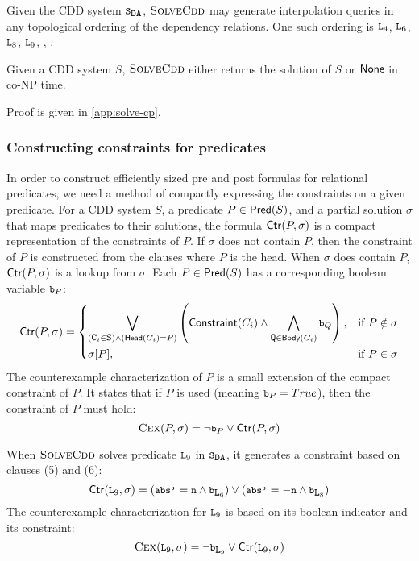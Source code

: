 %
\begin{ex}
  Given the CDD system $\mcchc$, $\textsc{SolveCdd}$ may generate interpolation
  queries in any topological ordering of the dependency relations.
  One such ordering is $\cc{L}_4$, $\cc{L}_6$, $\cc{L}_8$, $\cc{L}_9$, ,
  .
\end{ex}

\begin{thm}
  \label{thm:solve-cp}
  Given a CDD system $S$, $\textsc{SolveCdd}$ either returns the solution of $S$ or $\mathsf{None}$
  in co-NP time.
\end{thm}
Proof is given in \autoref{app:solve-cp}.

%
\subsubsection{Constructing constraints for predicates}
%
In order to construct efficiently sized pre and post formulas for
relational predicates, we need a method of compactly expressing the
constraints on a given predicate.
%
For a CDD system $S$, a predicate $P \in \mathsf{Pred}( S )$, and a partial
solution $\sigma$ that maps predicates to their solutions, the formula
$\mathsf{Ctr}(P,\sigma)$ is a compact representation of the constraints of
$P$.
%
If $\sigma$ does not contain $P$, then the constraint of $P$ is
constructed from the clauses where $P$ is the head.  When $\sigma$
does contain $P$, $\mathsf{Ctr}(P,\sigma)$ is a lookup from $\sigma$.
%
Each $P \in \mathsf{Pred}( S )$ has a corresponding boolean variable
$\cc{b}_P$:
%
\[
  \ctrof{P,\sigma}=
  \begin{dcases}
    \biglor_{(\cc{C}_i \in \cc{S}) \land (\headof{C_i} = P)}
    \left( \consof{C_i} \land %
      \bigland_{ \cc{Q} \in \bodyof{C_i}} \cc{b}_Q
    \right),
  &\text{if } P \notin \sigma\\
  \sigma[P], &\text{if } P \in \sigma
  \end{dcases}
\]
%
The counterexample characterization of $P$ is a small extension of the
compact constraint of $P$.
%
It states that if $P$ is used
(meaning $\cc{b}_{P} = True$), then the constraint of $P$ must hold:
\[
  \vc{P,\sigma} = \neg \cc{b}_{P} \lor \ctrof{P,\sigma}
\]


\begin{ex}
  \label{ex:ctr}
  When $\textsc{SolveCdd}$ solves predicate $\cc{L}_9$ in $\mcchc$, it generates a
  constraint based on clauses (5) and (6):
  $$\ctrof{\cc{L}_9,\sigma} =
    (\cc{abs'} = \cc{n} \land \cc{b}_{\cc{L}_6})
    \lor
    (\cc{abs'} = -\cc{n} \land \cc{b}_{\cc{L}_8})$$
  The counterexample characterization for $\cc{L}_9$ is based on its boolean
  indicator and its constraint:
  $$\vc{\cc{L}_9,\sigma} = \neg \cc{b}_{\cc{L}_9} \lor \ctrof{\cc{L}_9,\sigma}$$
\end{ex}

